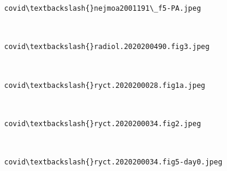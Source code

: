 \documentclass[11pt]{article}
\begin{document}
    \begin{Verbatim}[commandchars=\\\{\}]
covid\textbackslash{}nejmoa2001191\_f5-PA.jpeg
    \end{Verbatim}

    \begin{center}
    \end{center}
    { \hspace*{\fill} \\}
    
    \begin{Verbatim}[commandchars=\\\{\}]
covid\textbackslash{}radiol.2020200490.fig3.jpeg
    \end{Verbatim}

    \begin{center}
    \end{center}
    { \hspace*{\fill} \\}
    
    \begin{Verbatim}[commandchars=\\\{\}]
covid\textbackslash{}ryct.2020200028.fig1a.jpeg
    \end{Verbatim}

    \begin{center}
    \end{center}
    { \hspace*{\fill} \\}
    
    \begin{Verbatim}[commandchars=\\\{\}]
covid\textbackslash{}ryct.2020200034.fig2.jpeg
    \end{Verbatim}

    \begin{center}
    \end{center}
    { \hspace*{\fill} \\}
    
    \begin{Verbatim}[commandchars=\\\{\}]
covid\textbackslash{}ryct.2020200034.fig5-day0.jpeg
    \end{Verbatim}
\end{document}
